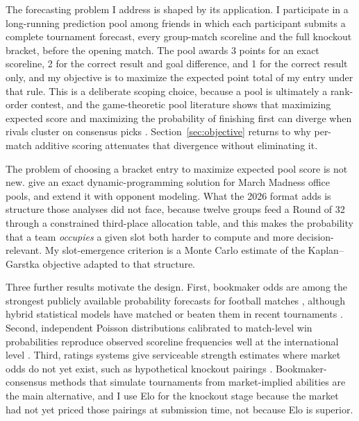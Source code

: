 \documentclass[11pt,letterpaper]{article}
\begin{document}
The forecasting problem I address is shaped by its application. I participate in a long-running prediction pool among friends in which each participant submits a complete tournament forecast, every group-match scoreline and the full knockout bracket, before the opening match. The pool awards 3 points for an exact scoreline, 2 for the correct result and goal difference, and 1 for the correct result only, and my objective is to maximize the expected point total of my entry under that rule. This is a deliberate scoping choice, because a pool is ultimately a rank-order contest, and the game-theoretic pool literature shows that maximizing expected score and maximizing the probability of finishing first can diverge when rivals cluster on consensus picks \citep{clairletscher2007}. Section~\ref{sec:objective} returns to why per-match additive scoring attenuates that divergence without eliminating it.

The problem of choosing a bracket entry to maximize expected pool score is not new. \citet{kaplangarstka2001} give an exact dynamic-programming solution for March Madness office pools, and \citet{clairletscher2007} extend it with opponent modeling. What the 2026 format adds is structure those analyses did not face, because twelve groups feed a Round of 32 through a constrained third-place allocation table, and this makes the probability that a team \emph{occupies} a given slot both harder to compute and more decision-relevant. My slot-emergence criterion is a Monte Carlo estimate of the Kaplan--Garstka objective adapted to that structure.

Three further results motivate the design. First, bookmaker odds are among the strongest publicly available probability forecasts for football matches \citep{strumbelj2014, leitner2010}, although hybrid statistical models have matched or beaten them in recent tournaments \citep{groll2018, groll2019}. Second, independent Poisson distributions calibrated to match-level win probabilities reproduce observed scoreline frequencies well at the international level \citep{maher1982, dixoncoles1997}. Third, ratings systems give serviceable strength estimates where market odds do not yet exist, such as hypothetical knockout pairings \citep{hvattum2010, elo1978, constantinou2019}. Bookmaker-consensus methods that simulate tournaments from market-implied abilities \citep{zeileis2018} are the main alternative, and I use Elo for the knockout stage because the market had not yet priced those pairings at submission time, not because Elo is superior.
\end{document}
